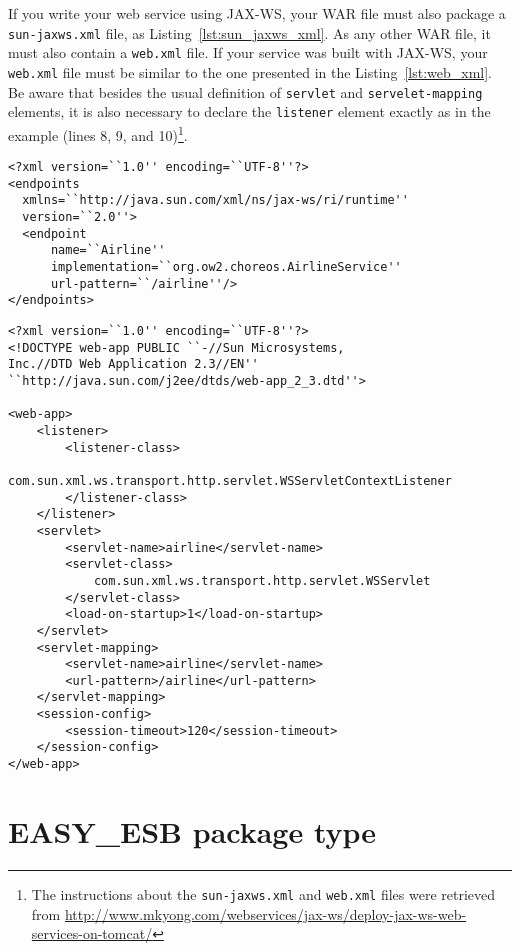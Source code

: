If you write your web service using JAX-WS, your WAR file must also package a \texttt{sun-jaxws.xml} file, as Listing~\ref{lst:sun_jaxws_xml}. As any other WAR file, it must also contain a \texttt{web.xml} file. If your service was built with JAX-WS, your \texttt{web.xml} file must be similar to the one presented in the Listing~\ref{lst:web_xml}. Be aware that besides the usual definition of \texttt{servlet} and \texttt{servelet-mapping} elements, it is also necessary to declare the \texttt{listener} element exactly as in the example (lines 8, 9, and 10)\footnote{The instructions about the \texttt{sun-jaxws.xml} and \texttt{web.xml} files were retrieved from \url{http://www.mkyong.com/webservices/jax-ws/deploy-jax-ws-web-services-on-tomcat/}}.

{\footnotesize
\begin{lstlisting}[caption=Example of \texttt{sun-jaxws.xml} file, label=lst:sun_jaxws_xml]
<?xml version=``1.0'' encoding=``UTF-8''?>
<endpoints
  xmlns=``http://java.sun.com/xml/ns/jax-ws/ri/runtime''
  version=``2.0''>
  <endpoint
      name=``Airline''
      implementation=``org.ow2.choreos.AirlineService''
      url-pattern=``/airline''/>
</endpoints>
\end{lstlisting}
}

{\footnotesize
\begin{lstlisting}[caption=Example of \texttt{web.xml} file, label=lst:web_xml]
<?xml version=``1.0'' encoding=``UTF-8''?>
<!DOCTYPE web-app PUBLIC ``-//Sun Microsystems, 
Inc.//DTD Web Application 2.3//EN''
``http://java.sun.com/j2ee/dtds/web-app_2_3.dtd''>
 
<web-app>
    <listener>
        <listener-class>
                com.sun.xml.ws.transport.http.servlet.WSServletContextListener
        </listener-class>
    </listener>
    <servlet>
        <servlet-name>airline</servlet-name>
        <servlet-class>
        	com.sun.xml.ws.transport.http.servlet.WSServlet
        </servlet-class>
        <load-on-startup>1</load-on-startup>
    </servlet>
    <servlet-mapping>
        <servlet-name>airline</servlet-name>
        <url-pattern>/airline</url-pattern>
    </servlet-mapping>
    <session-config>
        <session-timeout>120</session-timeout>
    </session-config>
</web-app>
\end{lstlisting}
}

\section{EASY\_ESB package type}

